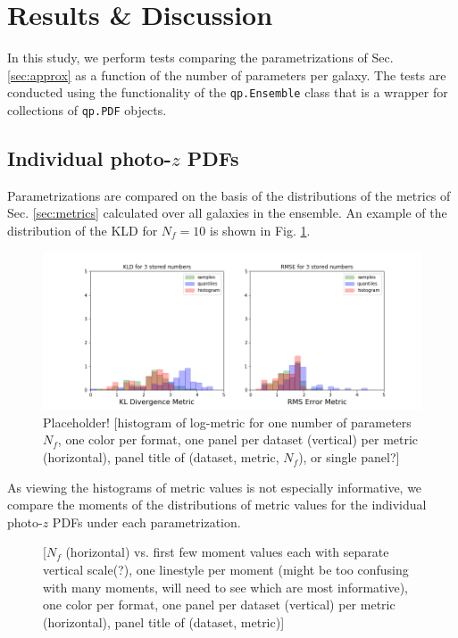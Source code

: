 \documentclass[\docopts]{\docclass}
\newcommand{\pz}{photo-$z$ PDF}
\begin{document}
\section{Results \& Discussion}
\label{sec:results}


In this study, we perform tests comparing the parametrizations of Sec. 
\ref{sec:approx} as a function of the number of parameters per galaxy.  The 
tests are conducted using the functionality of the \texttt{qp.Ensemble} class 
that is a wrapper for collections of \texttt{qp.PDF} objects.

\subsection{Individual \pz s}
\label{sec:individual}

Parametrizations are compared on the basis of the distributions of the metrics 
of Sec. \ref{sec:metrics} calculated over all galaxies in the ensemble.  An 
example of the distribution of the KLD for $N_{f}=10$ is shown in Fig. 
\ref{fig:individual}.

\begin{figure}
  \includegraphics[width=0.9\columnwidth]{figures/individual_placeholder.png}
  \caption{Placeholder! [histogram of log-metric for one number of parameters 
$N_{f}$, one color per format, one panel per dataset (vertical) per metric 
(horizontal), panel title of (dataset, metric, $N_{f}$), or single panel?]
  \label{fig:individual}}
\end{figure}

As viewing the histograms of metric values is not especially informative, we 
compare the moments of the distributions of metric values for the individual 
\pz s under each parametrization.

\begin{figure}
  \caption{ [$N_{f}$ (horizontal) vs. first few 
moment values each with separate vertical scale(?), one linestyle per moment 
(might be too confusing with many moments, will need to see which are most 
informative), one color per format, one panel per dataset (vertical) per metric 
(horizontal), panel title of (dataset, metric)]
  \label{fig:moments}}
\end{figure}
\end{document}
